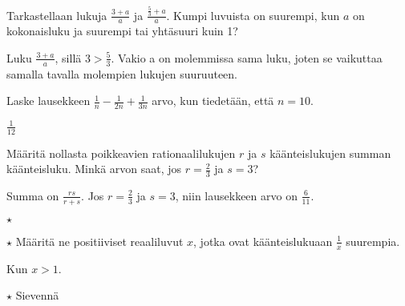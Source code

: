 \begin{tehtavasivu}
\begin{tehtava}
 Tarkastellaan lukuja $\frac{3+a}{a}$ ja $\frac{\frac{5}{3}+a}{a}$. Kumpi luvuista on suurempi, kun \(a\) on kokonaisluku ja suurempi tai yhtäsuuri kuin 1?
 \begin{vastaus}
  Luku $\frac{3+a}{a}$, sillä $3>\frac{5}{3}$. Vakio a on molemmissa sama luku, joten se vaikuttaa samalla tavalla molempien lukujen suuruuteen.
 \end{vastaus}
\end{tehtava}

\begin{tehtava}
	Laske lausekkeen $\frac{1}{n}-\frac{1}{2n}+\frac{1}{3n}$ arvo, kun tiedetään, että $n = 10$.
	\begin{vastaus}
		$\frac{1}{12}$
	\end{vastaus}
\end{tehtava}
\begin{tehtava}
	Määritä nollasta poikkeavien rationaalilukujen \(r\) ja \(s\) käänteislukujen summan käänteisluku. Minkä arvon saat, jos \(r=\frac{2}{3}\) ja \(s=3\)?
	\begin{vastaus}
		Summa on $\frac{rs}{r+s}$. Jos \(r=\frac{2}{3}\) ja \(s=3\), niin lausekkeen arvo on \(\frac{6}{11}\).
	\end{vastaus}
\end{tehtava}

\begin{tehtava} $\star$
	\begin{vastaus}
	\end{vastaus}
\end{tehtava}

\begin{tehtava} $\star$
	Määritä ne positiiviset reaaliluvut $x$, jotka ovat käänteislukuaan $\frac{1}{x}$ suurempia.
	\begin{vastaus}
	 Kun $x>1$.
	\end{vastaus}
\end{tehtava}

\begin{tehtava} $\star $
Sievennä
 \begin{vastaus}
	\alakohdat{
		§ $a+1$
		§ $4a$
	}
 \end{vastaus}
\end{tehtava}


\end{tehtavasivu}
